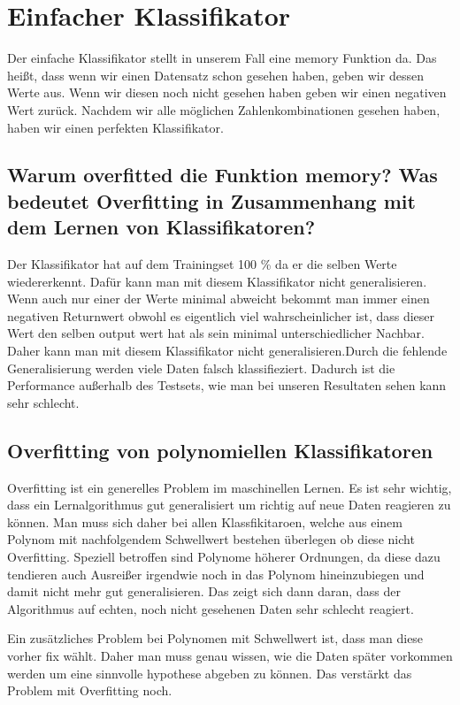 \section{Einfacher Klassifikator}
\label{ch:implementation}

Der einfache Klassifikator stellt in unserem Fall eine memory Funktion da. Das heißt, dass wenn wir einen Datensatz schon gesehen haben, geben wir dessen Werte aus. Wenn wir diesen noch nicht gesehen haben geben wir einen negativen Wert zurück. Nachdem wir alle möglichen Zahlenkombinationen gesehen haben, haben wir einen perfekten Klassifikator. 



\subsection{Warum overfitted die Funktion memory? Was bedeutet Overfitting in Zusammenhang mit dem Lernen von Klassifikatoren?} 

Der Klassifikator hat auf dem Trainingset 100 \% da er die selben Werte wiedererkennt. Dafür kann man mit diesem Klassifikator nicht generalisieren. Wenn auch nur einer der Werte minimal abweicht bekommt man immer einen negativen Returnwert obwohl es eigentlich viel wahrscheinlicher ist, dass dieser Wert den selben output wert hat als sein minimal unterschiedlicher Nachbar. Daher kann man mit diesem Klassifikator nicht generalisieren.Durch die fehlende Generalisierung werden viele Daten falsch klassifieziert. Dadurch ist die Performance außerhalb des Testsets, wie man bei unseren Resultaten sehen kann sehr schlecht. 


\subsection{Overfitting von polynomiellen Klassifikatoren}

Overfitting ist ein generelles Problem im maschinellen Lernen. Es ist sehr wichtig, dass ein Lernalgorithmus gut generalisiert um richtig auf neue Daten reagieren zu können. Man muss sich daher bei allen Klassfikitaroen, welche aus einem Polynom mit nachfolgendem Schwellwert bestehen überlegen ob diese nicht Overfitting. Speziell betroffen sind Polynome höherer Ordnungen, da diese dazu tendieren auch Ausreißer irgendwie noch in das Polynom hineinzubiegen und damit nicht mehr gut generalisieren. Das zeigt sich dann daran, dass der Algorithmus auf echten, noch nicht gesehenen Daten sehr schlecht reagiert. 

Ein zusätzliches Problem bei Polynomen mit Schwellwert ist, dass man diese vorher fix wählt. Daher man muss genau wissen, wie die Daten später vorkommen werden um eine sinnvolle hypothese abgeben zu können. Das verstärkt das Problem mit Overfitting noch. 


